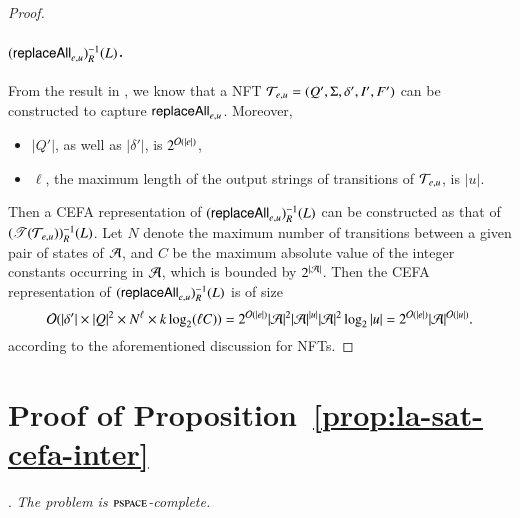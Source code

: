\begin{proof}
	\paragraph*{$(\mathsf{replaceAll}_{e,u})^{-1}_R(L)$.}
	From the result in \cite{CCH+18}, we know that  a NFT $\mathcal{T}_{e,u}=(Q', \Sigma, \delta', I', F')$ can be constructed to capture $\mathsf{replaceAll}_{e,u}$.  Moreover, 
	\begin{itemize}
		\item $|Q'|$, as well as $|\delta'|$, is $2^{\mathcal{O}(|e|)}$,
		\item $\ell$, the maximum length of the output strings of transitions of $\mathcal{T}_{e,u}$, is $|u|$.
	\end{itemize}
	Then a CEFA representation of $(\mathsf{replaceAll}_{e,u})^{-1}_R(L)$ can be constructed as that of $(\mathscr{T}(\mathcal{T}_{e,u}))^{-1}_R(L)$.
	Let $N$ denote the maximum number of transitions between a given pair of states of $\mathcal{A}$, and $C$ be the maximum absolute value of the integer constants occurring in $\mathcal{A}$, which is bounded by $2^{|\mathcal{A}|}$. Then the CEFA representation of $(\mathsf{replaceAll}_{e,u})^{-1}_R(L)$ is of size 
	\[
	\mathcal{O}(|\delta'| \times |Q|^2 \times N^\ell \times k \log_2 (\ell C)) = 2^{\mathcal{O}(|e|)} |\mathcal{A}|^2 |\mathcal{A}|^{|u|} |\mathcal{A}|^2 \log_2 |u|=2^{\mathcal{O}(|e|)} |\mathcal{A}|^{\mathcal{O}(|u|)}.
	\]
	according to the aforementioned discussion for NFTs.
\end{proof}

\section{Proof of Proposition~\ref{prop:la-sat-cefa-inter}}\label{app:sat-cefa}

.
\emph{The {\lasat} problem is $\textsc{pspace}$-complete.}

